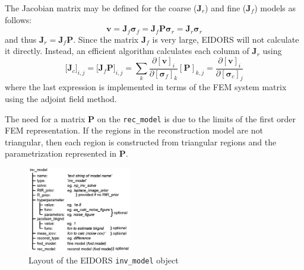 \documentclass[12pt,draft]{iopart}
\newcommand{\vB}{\mbox{$\mathbf{v}$}}
\newcommand{\JB}{\mbox{$\mathbf{J}$}}
\renewcommand{\PB}{\mbox{$\mathbf{P}$}}
\newcommand{\sG}{\mbox{${\boldsymbol \sigma}$}}
\begin{document}
The Jacobian matrix may be defined for the coarse
($\JB_r$) and fine ($\JB_f$) models as follows:
\begin{equation}
\vB = \JB_f \sG_f 
    = \JB_f \PB \sG_r
    = \JB_r     \sG_r
\end{equation}
and thus $\JB_r = \JB_f \PB$. Since the matrix
$\JB_f$ is very large, EIDORS will not calculate it
directly. Instead, an efficient algorithm calculates
each column of $\JB_r$ using
\begin{equation}
\big[ \JB_c \big]_{i,j} =
\big[ \JB_f \PB \big]_{i,j} =
\sum_k \frac{\partial [ \vB ]_i }
            {\partial [ \sG_f ]_k } [\PB]_{k,j}
= \frac{\partial [ \vB ]_i }
       {\partial [ \sG_c ]_j }
\end{equation}
where the last expression is implemented in terms
of the FEM system matrix using the adjoint field method.

The need for a matrix $\PB$ on the {\tt rec\_model} is
due to the limits of the first order FEM representation.
If the regions in the reconstruction model are not
triangular, then each region is constructed from triangular
regions and the parametrization represented in $\PB$.

\begin{figure}[tbh]
\begin{center}
 \includegraphics[width= 0.40\textwidth,bb=0 0 788 655]{../paper-EIT2008/figs/inv_model.png}
\caption{ \label{fig:invmdl}
\small
Layout of the EIDORS {\tt inv\_model} object
}
\end{center}
\vspace{-0.5cm}
\end{figure}
\end{document}
